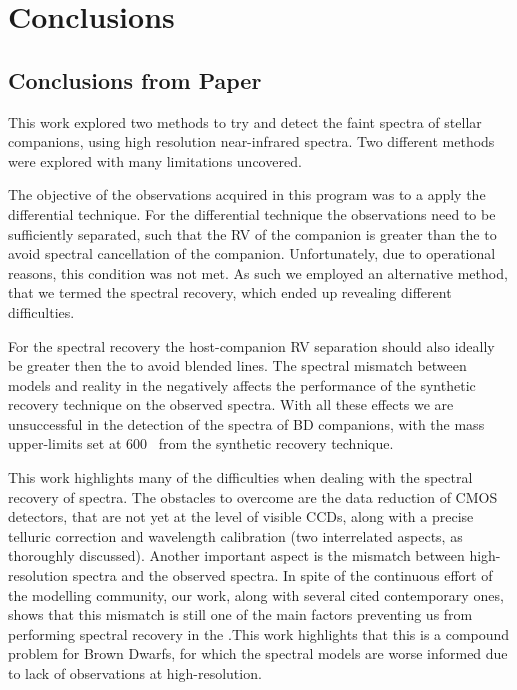 
\chapter{Conclusions}  %

\label{cha:conclusions}


\section{Conclusions from Paper}
\label{sec:conclusions}

This work explored two methods to try and detect the faint spectra of stellar companions, using high resolution near-infrared spectra.
Two different methods were explored with many limitations uncovered.

The objective of the observations acquired in this program was to a apply the differential technique.
For the differential technique the observations need to be sufficiently separated, such that the {RV} of the companion is greater than the {\fwhm} to avoid spectral cancellation of the companion.
Unfortunately, due to operational reasons, this condition was not met.
As such we employed an alternative method, that we termed the spectral recovery, which ended up revealing different difficulties.

For the spectral recovery the host-companion {RV} separation should also ideally be greater then the {\fwhm} to avoid blended lines.
The spectral mismatch between models and reality in the \nir{}negatively affects the performance of the synthetic recovery technique on the observed spectra.
With all these effects we are unsuccessful in the detection of the \nir{}spectra of BD companions,  with the mass upper-limits set at 600~\Mjup{} from the synthetic recovery technique.

This work highlights many of the difficulties when dealing with the spectral recovery of \nir{}spectra.
The obstacles to overcome are the data reduction of \nir{}CMOS detectors, that are not yet at the level of visible CCDs, along with a precise telluric correction and wavelength calibration (two interrelated aspects, as thoroughly discussed).
Another important aspect is the mismatch between \nir{}high-resolution spectra and the observed spectra.
In spite of the continuous effort of the modelling community, our work, along with several cited contemporary ones, shows that this mismatch is still one of the main factors preventing us from performing spectral recovery in the \nir{}.\@ This work highlights that this is a compound problem for Brown Dwarfs, for which the spectral models are worse informed due to lack of observations at high-resolution.

